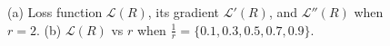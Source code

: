 \documentclass[final]{beamer}
\newlength{\onecolwid}
\newlength{\twocolwid}
\begin{document}
\begin{frame}[t]
\begin{columns}[t]
\begin{column}{\twocolwid}
\begin{columns}[t,totalwidth=\twocolwid]
\begin{column}{\onecolwid}
\begin{figure}
\begin{subfigure}[t]{0.4\textwidth}
            \subcaption{}\label{fig:b}
     \end{subfigure}\vspace{-10mm}
      \caption{(a) Loss function $\mathcal{L}(R)$, its gradient $\mathcal{L}'(R)$, and $\mathcal{L}''(R)$ when $r=2$. (b) $\mathcal{L}(R)$ vs $r$ when $\frac{1}{r}=\{0.1,0.3,0.5,0.7,0.9\}$. }
 \end{figure}

\end{column} %

\end{columns} %







\begin{columns}[t,totalwidth=\twocolwid] %

\begin{column}{\onecolwid} %




\end{column} %

\begin{column}{\onecolwid} %


\end{column}
\end{columns}
\end{column}
\end{columns}
\end{frame}
\end{document}

